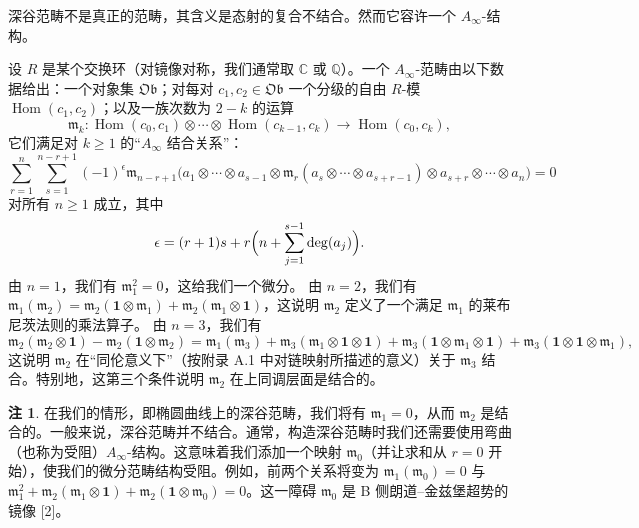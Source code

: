 \documentclass[11pt,a4paper]{article}
\theoremstyle{plain}
\theoremstyle{definition}
\newtheorem{remark}[theorem]{注}
\begin{document}
深谷范畴不是真正的范畴，其含义是态射的复合不结合。然而它容许一个 $A_\infty$-结构。

设 $R$ 是某个交换环（对镜像对称，我们通常取 $\mathbb{C}$ 或 $\mathbb{Q}$）。一个 $A_\infty$-范畴由以下数据给出：一个对象集 $\mathfrak{Ob}$；对每对 $c_1,c_2\in\mathfrak{Ob}$ 一个分级的自由 $R$-模 $\operatorname{Hom}(c_1,c_2)$；以及一族次数为 $2-k$ 的运算
\[
\mathfrak{m}_k\colon\operatorname{Hom}(c_0,c_1)\otimes\cdots\otimes\operatorname{Hom}(c_{k-1},c_k)\to\operatorname{Hom}(c_0,c_k),
\]
它们满足对 $k\ge 1$ 的“$A_\infty$ 结合关系”：
\[
\sum_{r=1}^{n}\sum_{s=1}^{n-r+1}(-1)^{\epsilon}\mathfrak{m}_{n-r+1}\bigl(a_1\otimes\cdots\otimes a_{s-1}\otimes\mathfrak{m}_r(a_s\otimes\cdots\otimes a_{s+r-1})\otimes a_{s+r}\otimes\cdots\otimes a_n\bigr)=0
\]
对所有 $n\ge 1$ 成立，其中
\[
\epsilon=(r+1)s+r\Bigl(n+\sum_{j=1}^{s-1}\deg(a_j)\Bigr).
\]
由 $n=1$，我们有 $\mathfrak{m}_1^2=0$，这给我们一个微分。
由 $n=2$，我们有 $\mathfrak{m}_1(\mathfrak{m}_2)=\mathfrak{m}_2(\mathbf{1}\otimes\mathfrak{m}_1)+\mathfrak{m}_2(\mathfrak{m}_1\otimes\mathbf{1})$，这说明 $\mathfrak{m}_2$ 定义了一个满足 $\mathfrak{m}_1$ 的莱布尼茨法则的乘法算子。
由 $n=3$，我们有
\[
\mathfrak{m}_2(\mathfrak{m}_2\otimes\mathbf{1})-\mathfrak{m}_2(\mathbf{1}\otimes\mathfrak{m}_2)=\mathfrak{m}_1(\mathfrak{m}_3)+\mathfrak{m}_3(\mathfrak{m}_1\otimes\mathbf{1}\otimes\mathbf{1})+\mathfrak{m}_3(\mathbf{1}\otimes\mathfrak{m}_1\otimes\mathbf{1})+\mathfrak{m}_3(\mathbf{1}\otimes\mathbf{1}\otimes\mathfrak{m}_1),
\]
这说明 $\mathfrak{m}_2$ 在“同伦意义下”（按附录 A.1 中对链映射所描述的意义）关于 $\mathfrak{m}_3$ 结合。特别地，这第三个条件说明 $\mathfrak{m}_2$ 在上同调层面是结合的。
\begin{remark}
在我们的情形，即椭圆曲线上的深谷范畴，我们将有 $\mathfrak{m}_1=0$，从而 $\mathfrak{m}_2$ 是结合的。一般来说，深谷范畴并不结合。通常，构造深谷范畴时我们还需要使用弯曲（也称为受阻）$A_\infty$-结构。这意味着我们添加一个映射 $\mathfrak{m}_0$（并让求和从 $r=0$ 开始），使我们的微分范畴结构受阻。例如，前两个关系将变为 $\mathfrak{m}_1(\mathfrak{m}_0)=0$ 与 $\mathfrak{m}_1^2+\mathfrak{m}_2(\mathfrak{m}_1\otimes\mathbf{1})+\mathfrak{m}_2(\mathbf{1}\otimes\mathfrak{m}_0)=0$。这一障碍 $\mathfrak{m}_0$ 是 B 侧朗道–金兹堡超势的镜像 [2]。
\end{remark}
\end{document}
